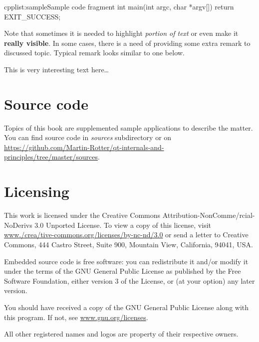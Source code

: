 \begin{fdoccode}{cpp}{list:sample}{Sample code fragment}
int main(int argc, char *argv[]) {
	return EXIT_SUCCESS;
}
\end{fdoccode}

Note that sometimes it is needed to highlight \emph{portion of text} or even make it \textbf{really visible}. In some cases, there is a need of providing some extra remark to discussed topic. Typical remark looks similar to one below.

\begin{fdocextra}
This is very interesting text here\ldots
\end{fdocextra}

\section*{Source code}
Topics of this book are supplemented sample applications to describe the matter. You can find source code in \textit{sources} subdirectory or on \url{https://github.com/Martin-Rotter/qt-internals-and-principles/tree/master/sources}.

\section*{Licensing}
This work is licensed under the Creative Commons Attribution-NonComme\-/rcial-NoDerivs 3.0 Unported License. To view a copy of this license, visit \href{http://www.creativecommons.org/licenses/by-nc-nd/3.0}{www.\-/crea\-/tive-commons.org/licenses/by-nc-nd/3.0} or send a letter to Creative Commons, 444 Castro Street, Suite 900, Mountain View, California, 94041, USA.

Embedded \cpp source code is free software: you can redistribute it and/or modify it under the terms of the GNU General Public License as published by the Free Software Foundation, either version 3 of the License, or (at your option) any later version.

You should have received a copy of the GNU General Public License along with this program. If not, see \href{http://www.gnu.org/licenses}{www.gnu.org/licenses}.

All other registered names and logos are property of their respective owners.